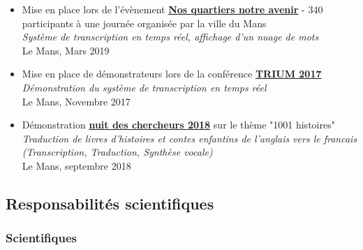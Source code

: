 \documentclass[11pt,a4paper]{article}
\begin{document}
\begin{itemize}
\item Mise en place lors de l'évènement \href{https://www.lemans.fr/citoyen/le-vivre-ensemble/le-contrat-de-ville/la-journee-nos-quartiers-notre-avenir/}{\textbf{Nos quartiers notre avenir}} - 340 participants à une journée organisée par la ville du Mans \\
\textit{Système de transcription en temps réel, affichage d'un nuage de mots}\\
Le Mans, Mars 2019

\item Mise en place de démonstrateurs lors de la conférence  \href{http://trium.univ-lemans.fr/fr/trium-2017.html}{\textbf{TRIUM 2017}} \\
\textit{Démonstration du système de transcription en temps réel}\\
Le Mans, Novembre 2017

\item Démonstration  \href{https://www.ouest-france.fr/pays-de-la-loire/le-mans-72000/le-mans-1-001-histoires-la-nuit-des-chercheurs-5984850}{\textbf{nuit des chercheurs 2018}} sur le thème "1001 histoires"\\
\textit{Traduction de livres d'histoires et contes enfantins de l'anglais vers le francais (Transcription, Traduction, Synthèse vocale)}\\
Le Mans, septembre 2018

\end{itemize}


\subsection{Responsabilités scientifiques}

\subsubsection{Scientifiques}
\end{document}
